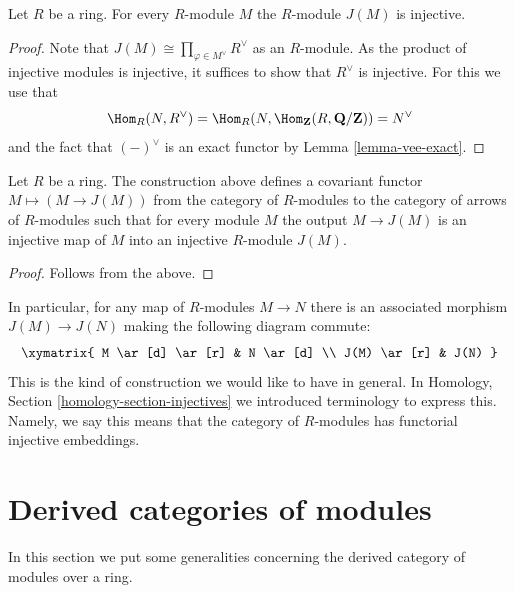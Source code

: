 \begin{lemma}
\label{lemma-JM-injective}
Let $R$ be a ring. For every $R$-module $M$ the
$R$-module $J(M)$ is injective.
\end{lemma}

\begin{proof}
Note that $J(M) \cong \prod_{\varphi \in M^\vee} R^\vee$ as an $R$-module.
As the product of injective modules is injective, it suffices to
show that $R^\vee$ is injective. For this we use that
$$
\Hom_R(N, R^\vee) =
\Hom_R(N, \Hom_{\mathbf{Z}}(R, \mathbf{Q}/\mathbf{Z})) =
N^\vee
$$
and the
fact that $(-)^\vee$ is an exact functor by Lemma
\ref{lemma-vee-exact}.
\end{proof}

\begin{lemma}
\label{lemma-injectives-modules}
Let $R$ be a ring.
The construction above defines a covariant functor
$M \mapsto (M \to J(M))$ from the category of
$R$-modules to the category of arrows of $R$-modules
such that for every module $M$ the output
$M \to J(M)$ is an injective map of $M$ into
an injective $R$-module $J(M)$.
\end{lemma}

\begin{proof}
Follows from the above.
\end{proof}

\noindent
In particular, for any map of $R$-modules $M \to N$
there is an associated morphism $J(M) \to J(N)$
making the following diagram commute:
$$
\xymatrix{
M \ar[d] \ar[r] & N \ar[d] \\
J(M) \ar[r] & J(N) }
$$
This is the kind of construction we would like to have in general.
In Homology, Section \ref{homology-section-injectives}
we introduced terminology to express this. Namely,
we say this means that the category of $R$-modules
has functorial injective embeddings.











\section{Derived categories of modules}
\label{section-derived-modules}

\noindent
In this section we put some generalities concerning the
derived category of modules over a ring.

